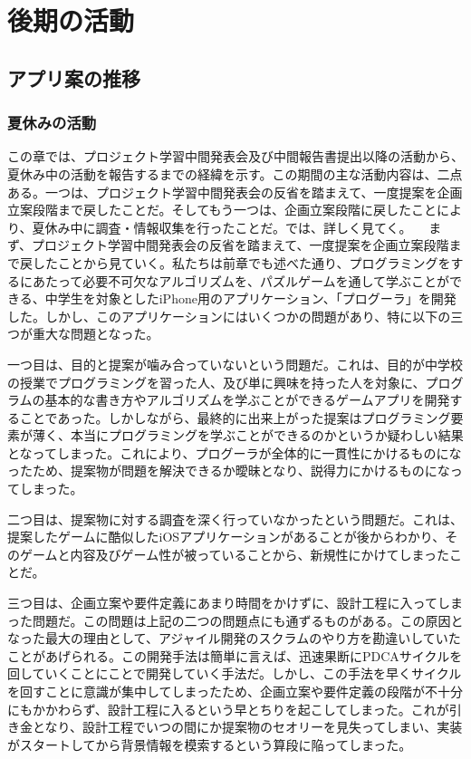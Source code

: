 \documentclass[openany,11pt,papersize]{jsbook}
\begin{document}
\chapter{後期の活動}

\section{アプリ案の推移}

\subsection{夏休みの活動}
\par この章では、プロジェクト学習中間発表会及び中間報告書提出以降の活動から、夏休み中の活動を報告するまでの経緯を示す。この期間の主な活動内容は、二点ある。一つは、プロジェクト学習中間発表会の反省を踏まえて、一度提案を企画立案段階まで戻したことだ。そしてもう一つは、企画立案段階に戻したことにより、夏休み中に調査・情報収集を行ったことだ。では、詳しく見てく。
　まず、プロジェクト学習中間発表会の反省を踏まえて、一度提案を企画立案段階まで戻したことから見ていく。私たちは前章でも述べた通り、プログラミングをするにあたって必要不可欠なアルゴリズムを、パズルゲームを通して学ぶことができる、中学生を対象としたiPhone用のアプリケーション、「プログーラ」を開発した。しかし、このアプリケーションにはいくつかの問題があり、特に以下の三つが重大な問題となった。
\par 一つ目は、目的と提案が噛み合っていないという問題だ。これは、目的が中学校の授業でプログラミングを習った人、及び単に興味を持った人を対象に、プログラムの基本的な書き方やアルゴリズムを学ぶことができるゲームアプリを開発することであった。しかしながら、最終的に出来上がった提案はプログラミング要素が薄く、本当にプログラミングを学ぶことができるのかというか疑わしい結果となってしまった。これにより、プログーラが全体的に一貫性にかけるものになったため、提案物が問題を解決できるか曖昧となり、説得力にかけるものになってしまった。
\par 二つ目は、提案物に対する調査を深く行っていなかったという問題だ。これは、提案したゲームに酷似したiOSアプリケーションがあることが後からわかり、そのゲームと内容及びゲーム性が被っていることから、新規性にかけてしまったことだ。
\par 三つ目は、企画立案や要件定義にあまり時間をかけずに、設計工程に入ってしまった問題だ。この問題は上記の二つの問題点にも通ずるものがある。この原因となった最大の理由として、アジャイル開発のスクラムのやり方を勘違いしていたことがあげられる。この開発手法は簡単に言えば、迅速果断にPDCAサイクルを回していくことにことで開発していく手法だ。しかし、この手法を早くサイクルを回すことに意識が集中してしまったため、企画立案や要件定義の段階が不十分にもかかわらず、設計工程に入るという早とちりを起こしてしまった。これが引き金となり、設計工程でいつの間にか提案物のセオリーを見失ってしまい、実装がスタートしてから背景情報を模索するという算段に陥ってしまった。
\end{document}
